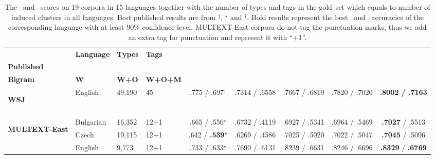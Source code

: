 \begin{table}[ht]
  \small
  \centering
  \caption{The \mto\ and \vm\ scores on 19 corpora in 15 languages
    together with the number of types and tags in the gold--set which
    equals to number of induced clusters in all languages.  Best
    published results are from
    $^\ddagger$\protect\cite{blunsom-cohn:2011:ACL-HLT2011},
    $^\star$\protect\cite{christodoulopoulos-goldwater-steedman:2011:EMNLP}
    and $^\dagger$\protect\cite{Clark:2003:CDM:1067807.1067817}. Bold
    results represent the best \mto\ and \vm\ accuracies of the
    corresponding language with at least 90\% confidence level.
    MULTEXT-East corpora do not tag the punctuation marks, thus we add
    an extra tag for punctuation and represent it with ``+1''.}
  \label{tab:multiresults}
  \begin{flushleft}
  \begin{tabular}{|@{ }l@{ }|@{ }l@{ }|@{ }l@{ }|@{ }l@{ }|@{ }c@{ }|@{ }c@{ }|@{ }c@{ }|@{ }c@{ }|@{ }c@{ }|}
        \hline
        & {\bf Language}   & {\bf Types}   & {\bf Tags} & \specialcell{{\bf Best}\\{\bf Published}} &
        \specialcell{{\bf Syntagmatic}\\{\bf Bigram}} &{\bf W}
        & {\bf W+O}            & {\bf W+O+M}     \\ \hline %
        \multirow{1}{*}{\begin{sideways}\textbf{WSJ}\end{sideways}} 
        & English    & 49,190  & 45 & .775 / .697$^\ddagger$  &.7314 / .6558 & .7667 / .6819 & .7820 / .7020 &{\bf.8002 / .7163}           \\
        & & & & & & & &\\ \hline
        \multirow{8}{*}{\begin{sideways}\textbf{MULTEXT-East}\end{sideways}}
        & Bulgarian    & 16,352  & 12+1 & .665 / .556$^\star$    & .6732 / .4119 & .6927 / .5341 & .6964 / .5469     & {\bf.7027} / .5513 \\
        & Czech      & 19,115  & 12+1 & .642 / {\bf.539}$^\star$    & .6269 / .4586 & .7025 / .5020 & .7022 / .5047     & {\bf .7045} / .5096 \\
        & English    & 9,773   & 12+1 & .733 / .633$^\star$    & .7690 /. 6131 & .8239 / .6631 & .8246 / .6696      & {\bf .8329} / {\bf.6769} \\

\end{tabular}
\end{flushleft}
\end{table}
